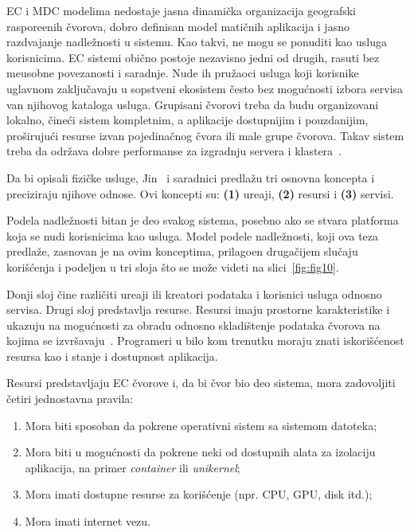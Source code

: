 EC i MDC modelima nedostaje jasna dinami\v cka organizacija geografski raspore\dj enih \v cvorova, dobro definisan model mati\v cnih aplikacija i jasno razdvajanje nadle\v znosti u sistemu. Kao takvi, ne mogu se ponuditi kao usluga korisnicima. EC sistemi obi\v cno postoje nezavisno jedni od drugih, rasuti bez me\dj usobne povezanosti i saradnje. Nude ih pru\v zaoci usluga koji korisnike uglavnom zaklju\v cavaju u sopstveni ekosistem \v cesto bez mogu\'cnosti izbora servisa van njihovog kataloga usluga. Grupisani \v cvorovi treba da budu organizovani lokalno, \v cine\'ci sistem kompletnim, a aplikacije dostupnijim i pouzdanijim, pro\v siruju\'ci resurse izvan pojedina\v cnog \v cvora ili male grupe \v cvorova. Takav sistem treba da odr\v zava dobre performanse za izgradnju servera i klastera~\cite{ArocaG12}.

Da bi opisali fizi\v cke usluge, Jin~\cite {JinCJL14} i saradnici predla\v zu tri osnovna koncepta i preciziraju njihove odnose. Ovi koncepti su: \textbf{(1)} ure\dj aji, \textbf{(2)} resursi i \textbf{(3)} servisi. 

Podela nadle\v znosti bitan je deo svakog sistema, posebno ako se stvara platforma koja se nudi korisnicima kao usluga. Model podele nadle\v znosti, koji ova teza predla\v ze, zasnovan je na ovim konceptima, prilago\dj en druga\v cijem slu\v caju kori\v s\'cenja i  podeljen u tri sloja \v sto se mo\v ze videti na slici~\ref {fig:fig10}. 

Donji sloj \v cine razli\v citi ure\dj aji ili kreatori podataka i korisnici usluga odnosno servisa. Drugi sloj predstavlja resurse. Resursi imaju prostorne karakteristike i ukazuju na mogu\'cnosti za obradu odnosno skladi\v stenje podataka \v cvorova na kojima se izvr\v savaju~\cite{JinCJL14}. Programeri u bilo kom trenutku moraju znati iskori\v s\'cenost resursa kao i stanje i dostupnost aplikacija. 

Resursi predstavljaju EC \v cvorove i, da bi \v cvor bio deo sistema, mora zadovoljiti \v cetiri jednostavna pravila: 

\begin{enumerate}[start=1,label={(\bfseries \arabic*)}]
\item Mora biti sposoban da pokrene operativni sistem sa sistemom datoteka;
\item Mora biti u mogu\'cnosti da pokrene neki od dostupnih alata za izolaciju aplikacija, na primer \textit{container} ili \textit{unikernel}; 
\item Mora imati dostupne resurse za kori\v s\'cenje (npr. CPU, GPU, disk itd.);
\item Mora imati internet vezu.
\end{enumerate}

